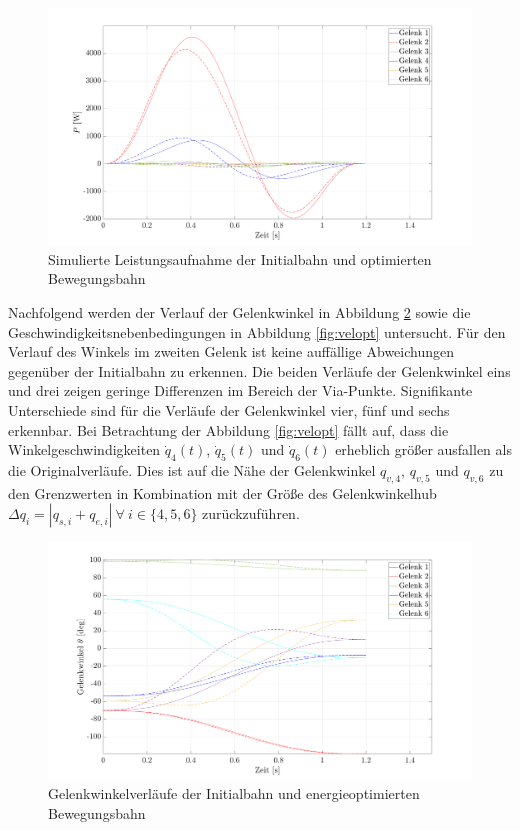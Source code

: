 %
\begin{figure}[tbph]
	\centering
	\includegraphics[width=1\linewidth]{images/Optimierungsergebnisse_up/popt}
	\caption{Simulierte Leistungsaufnahme der Initialbahn und optimierten Bewegungsbahn}
	\label{fig:popt}
\end{figure}
%
Nachfolgend werden der Verlauf der Gelenkwinkel in Abbildung \ref{fig:posopt} sowie die Geschwindigkeitsnebenbedingungen in Abbildung \ref{fig:velopt} untersucht. Für den Verlauf des Winkels im zweiten Gelenk ist keine auffällige Abweichungen gegenüber der Initialbahn zu erkennen. Die beiden Verläufe der Gelenkwinkel eins und drei zeigen geringe Differenzen im Bereich der Via-Punkte. Signifikante Unterschiede sind für die Verläufe der Gelenkwinkel vier, fünf und sechs erkennbar.  Bei Betrachtung der Abbildung \ref{fig:velopt} fällt auf, dass die Winkelgeschwindigkeiten $\dot{q}_{4}(t)$, $\dot{q}_{5}(t)$ und $\dot{q}_{6}(t)$ erheblich größer ausfallen als die Originalverläufe. Dies ist auf die Nähe der Gelenkwinkel ${q}_{v,4}$, ${q}_{v,5}$ und ${q}_{v,6}$ zu den Grenzwerten in Kombination mit der Größe des Gelenkwinkelhub $\Delta q_i = | q_{s,i}+q_{e,i} | ~\forall~ i \in \{4,5,6\}$ zurückzuführen. 
%
\begin{figure}[tbph]
	\centering
	\includegraphics[width=1\linewidth]{images/Optimierungsergebnisse_up/posopt}
	\caption{Gelenkwinkelverläufe der Initialbahn und energieoptimierten Bewegungsbahn}
	\label{fig:posopt}
\end{figure}

